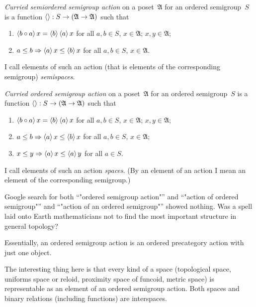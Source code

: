 \documentclass{amsart}
\begin{document}
\begin{defn}
\emph{Curried semiordered semigroup action} on a poset~$\mathfrak{A}$ for an ordered semigroup~$S$ is a function $\left\langle \right\rangle:S\to(\mathfrak{A}\to\mathfrak{A})$ such that
\begin{enumerate}
\item $\left\langle b\circ a\right\rangle x = \left\langle b\right\rangle\left\langle a\right\rangle x$ for all $a,b\in S$, $x\in\mathfrak{A}$;
$x,y\in\mathfrak{A}$;
\item $a\leq b\Rightarrow\left\langle a\right\rangle x\leq \left\langle b\right\rangle x$ for all $a,b\in S$, $x\in\mathfrak{A}$.
\end{enumerate}
I call elements of such an action (that is elements of the corresponding semigroup) \emph{semispaces}.
\end{defn}

\begin{defn}
\emph{Curried ordered semigroup action} on a poset~$\mathfrak{A}$ for an ordered semigroup~$S$ is a function $\left\langle \right\rangle:S\to(\mathfrak{A}\to\mathfrak{A})$ such that
\begin{enumerate}
\item $\left\langle b\circ a\right\rangle x = \left\langle b\right\rangle\left\langle a\right\rangle x$ for all $a,b\in S$, $x\in\mathfrak{A}$;
$x,y\in\mathfrak{A}$;
\item $a\leq b\Rightarrow\left\langle a\right\rangle x\leq \left\langle b\right\rangle x$ for all $a,b\in S$, $x\in\mathfrak{A}$;
\item $x\leq y\Rightarrow\left\langle a\right\rangle x\leq \left\langle a\right\rangle y$ for all $a\in S$.
\end{enumerate}
I call elements of such an action \emph{spaces}. (By an element of an action I mean an element of the corresponding semigroup.)
\end{defn}

\begin{rem}
Google search for both ``"ordered semigroup action"'' and ``"action of ordered semigroup"'' and ``"action of an ordered semigroup"'' showed nothing. Was a spell laid onto Earth mathematicians not to find the most important structure in general topology?
\end{rem}

Essentially, an ordered semigroup action is an ordered precategory action with just one object.

The interesting thing here is that every kind of a space
(topological space, uniforms space or reloid, proximity space
of funcoid, metric space) is representable as an element of
an ordered semigroup action. Both spaces and binary relations
(including functions) are interspaces.
\end{document}
